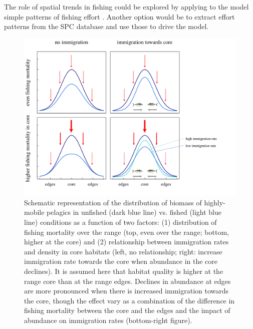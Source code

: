 \documentclass{article}
\begin{document}
The role of spatial trends in fishing could be explored by applying to
the model simple patterns of fishing effort \citep[as in, for
e.g.][]{Swain1994_a}. Another option would be to extract effort
patterns from the SPC database and use those to drive the model.

\begin{figure}
\label{chap3diag2}
\includegraphics[scale=0.75]{LTB_ResProposal_2013_Chap3_Diagram2.png}
\caption{Schematic representation of the distribution of biomass of
  highly-mobile pelagics in unfished (dark blue line) vs. fished
  (light blue line) conditions as a function of two factors: (1)
  distribution of fishing mortality over
  the range (top, even over the range; bottom, higher at the core) and
  (2) relationship between immigration rates and density in core
  habitats (left, no relationship; right: increase immigration rate
  towards the core when abundance in the core declines). It is assumed
  here that habitat quality is higher at the range core than at the
  range edges. Declines in
  abundance at edges are more
  pronounced when there is increased immigration towards the core,
  though the effect vary as a combination of the difference in
  fishing mortality between the core and the edges and the impact of
  abundance on immigration rates (bottom-right figure).   }
\end{figure}


\end{document}
